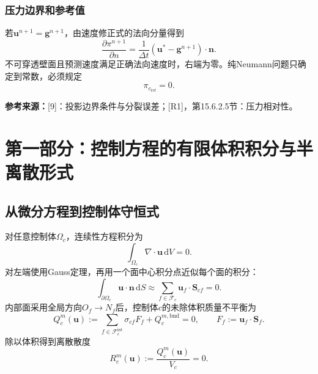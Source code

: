\documentclass[UTF8,12pt,a4paper]{ctexart}
\numberwithin{equation}{section}
\newcommand{\dt}{\Delta t}
\newcommand{\Guermond}{\textnormal{[9]}}
\newcommand{\Rone}{\textnormal{[R1]}}
\newcommand{\source}[1]{\par\smallskip\noindent\colorbox{sourcebg}{%
  \parbox{0.955\linewidth}{\footnotesize\color{sourcegray}\textbf{参考来源：}#1}}\par\smallskip}
\begin{document}
\subsubsection*{压力边界和参考值}
若$\bm u^{n+1}=\bm g^{n+1}$，由速度修正式的法向分量得到
\begin{equation}
  \boxed{\frac{\partial\pi^{n+1}}{\partial n}
  =\frac{1}{\dt}(\bm u^*-\bm g^{n+1})\cdot\bm n.}
  \label{eq:pressure_neumann}
\end{equation}
不可穿透壁面且预测速度满足正确法向速度时，右端为零。纯Neumann问题只确定到常数，必须规定
\begin{equation}
  \boxed{\pi_{c_{\mathrm{ref}}}=0.}
  \label{eq:pressure_reference}
\end{equation}
\source{\Guermond：投影边界条件与分裂误差；\Rone，第15.6.2.5节：压力相对性。}

\section{第一部分：控制方程的有限体积积分与半离散形式}
\subsection{从微分方程到控制体守恒式}
对任意控制体$\Omega_c$，连续性方程积分为
\begin{equation}
  \int_{\Omega_c}\nabla\cdot\bm u\,\mathrm dV=0.
\end{equation}
对左端使用Gauss定理，再用一个面中心积分点近似每个面的积分：
\begin{equation}
  \int_{\partial\Omega_c}\bm u\cdot\bm n\,\mathrm dS
  \approx\sum_{f\in\mathcal F_c}\bm u_f\cdot\bm S_{cf}=0.
\end{equation}
内部面采用全局方向$O_f\to N_f$后，控制体$c$的未除体积质量不平衡为
\begin{equation}
  \boxed{Q_c^m(\bm u):=
  \sum_{f\in\mathcal F_c^{\mathrm{int}}}\sigma_{cf}F_f
  +Q_c^{m,\mathrm{bnd}}=0,
  \qquad F_f:=\bm u_f\cdot\bm S_f.}
  \label{eq:semidiscrete_continuity}
\end{equation}
除以体积得到离散散度
\begin{equation}
  \boxed{R_c^m(\bm u):=\frac{Q_c^m(\bm u)}{V_c}=0.}
  \label{eq:semidiscrete_mass_residual}
\end{equation}
\end{document}
